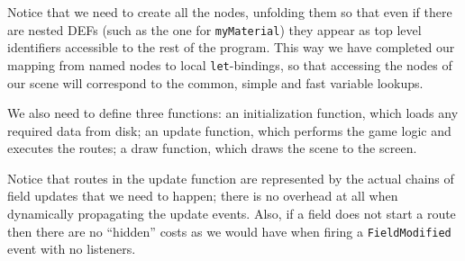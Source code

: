 Notice that we need to create all the nodes, unfolding them so that even if there are nested DEFs (such as the one for \texttt{myMaterial}) they appear as top level identifiers accessible to the rest of the program. This way we have completed our mapping from named nodes to local \texttt{let}-bindings, so that accessing the nodes of our scene will correspond to the common, simple and fast variable lookups.

We also need to define three functions: an initialization function, which loads any required data from disk; an update function, which performs the game logic and executes the routes; a draw function, which draws the scene to the screen.

Notice that routes in the update function are represented by the actual chains of field updates that we need to happen; there is no overhead at all when dynamically propagating the update events. Also, if a field does not start a route then there are no ``hidden'' costs as we would have when firing a \texttt{FieldModified} event with no listeners.


